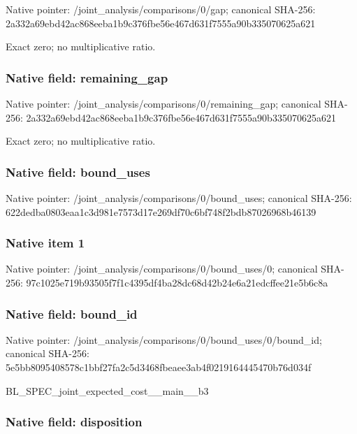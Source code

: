 \documentclass[10pt,a4paper]{article}
\begin{document}
Native pointer: /joint\_analysis/comparisons/0/gap; canonical SHA-256: 2a332a69ebd42ac868eeba1b\allowbreak{}9c376fbe56e467d631f7555a\allowbreak{}90b335070625a621


Exact zero; no multiplicative ratio.


\subsubsection{Native field: remaining\_gap}


Native pointer: /joint\_analysis/comparis\allowbreak{}ons/0/remaining\_gap; canonical SHA-256: 2a332a69ebd42ac868eeba1b\allowbreak{}9c376fbe56e467d631f7555a\allowbreak{}90b335070625a621


Exact zero; no multiplicative ratio.


\subsubsection{Native field: bound\_uses}


Native pointer: /joint\_analysis/comparis\allowbreak{}ons/0/bound\_uses; canonical SHA-256: 622dedba0803eaa1c3d981e7\allowbreak{}573d17e269df70c6bf748f2b\allowbreak{}db87026968b46139



\subsubsection{Native item 1}


Native pointer: /joint\_analysis/comparis\allowbreak{}ons/0/bound\_uses/0; canonical SHA-256: 97c1025e719b93505f7f1c43\allowbreak{}95df4ba28dc68d42b24e6a21\allowbreak{}edcffee21e5b6c8a



\subsubsection{Native field: bound\_id}


Native pointer: /joint\_analysis/comparis\allowbreak{}ons/0/bound\_uses/0/bound\allowbreak{}\_id; canonical SHA-256: 5e5bb8095408578c1bbf27fa\allowbreak{}2c5d3468fbeaee3ab4f02191\allowbreak{}64445470b76d034f


BL\_SPEC\_joint\_expected\_cost\_\_main\_\_b3


\subsubsection{Native field: disposition}
\end{document}
